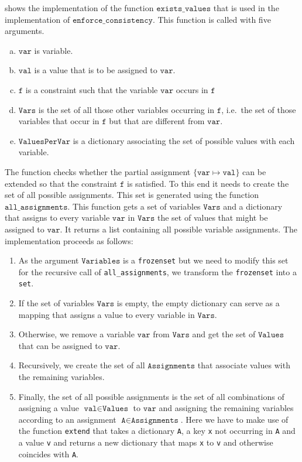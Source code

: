 \noindent
{} shows the implementation of the function $\texttt{exists\_values}$ that
is used in the implementation of $\texttt{enforce\_consistency}$.  This function is called with five arguments.
\begin{enumerate}[(a)]
\item $\texttt{var}$ is variable.
\item $\texttt{val}$ is a value that is to be assigned to $\texttt{var}$.
\item $\texttt{f}$ is a constraint such that the variable $\texttt{var}$ occurs in $\texttt{f}$
\item $\texttt{Vars}$ is the set of all those other variables occurring in $\texttt{f}$, i.e.~the set of those
      variables that occur in $\texttt{f}$ but that are different from $\texttt{var}$. 
\item $\texttt{ValuesPerVar}$  is a dictionary associating the set of possible values with each variable.
\end{enumerate}
The function checks whether the partial assignment $\{ \texttt{var} \mapsto \texttt{val} \}$ can be
extended so that the constraint $\texttt{f}$ is satisfied.  To this end it needs to create the set of all
possible assignments.  This set is generated using the function $\texttt{all\_assignments}$.  This function
gets a set of variables $\texttt{Vars}$ and a dictionary that assigns to every variable $\texttt{var}$ in
$\texttt{Vars}$ the set of values that might be assigned to $\texttt{var}$.  It returns a list containing all
possible variable assignments.  The implementation proceeds as follows:
\begin{enumerate}
\item As the argument $\texttt{Variables}$ is a \texttt{frozenset} but we need to modify this set for the
      recursive call of \texttt{all\_assignments}, we transform the \texttt{frozenset} into a \texttt{set}.
\item If the set of variables $\texttt{Vars}$ is empty, the empty dictionary can serve as a mapping that 
      assigns a value to every variable in $\texttt{Vars}$.
\item Otherwise, we remove a variable $\texttt{var}$ from $\texttt{Vars}$ and get the set of $\texttt{Values}$
      that can be assigned to $\texttt{var}$.  
\item Recursively, we create the set of all $\texttt{Assignments}$ that associate values with the remaining 
      variables.
\item Finally, the set of all possible assignments is the set of all combinations of assigning a value 
      $\texttt{val} \in \texttt{Values}$ to $\texttt{var}$ and assigning the remaining variables according to 
      an assignment $\texttt{A} \in \texttt{Assignments}$.  Here we have to make use of the function
      \texttt{extend} that takes a dictionary \texttt{A}, a key \texttt{x} not occurring in \texttt{A} and a
      value \texttt{v} and returns a new dictionary that maps \texttt{x} to \texttt{v} and otherwise coincides
      with \texttt{A}.
\end{enumerate}
